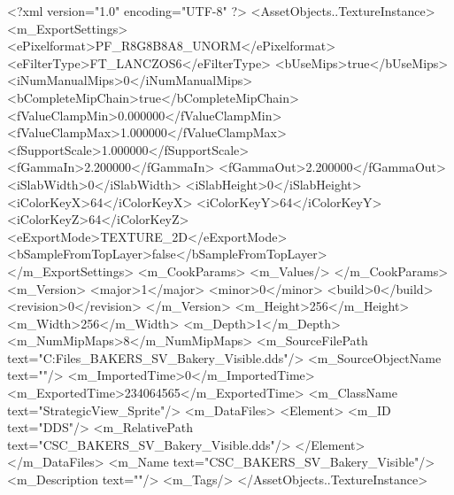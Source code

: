<?xml version="1.0" encoding="UTF-8" ?>
<AssetObjects..TextureInstance>
	<m_ExportSettings>
		<ePixelformat>PF_R8G8B8A8_UNORM</ePixelformat>
		<eFilterType>FT_LANCZOS6</eFilterType>
		<bUseMips>true</bUseMips>
		<iNumManualMips>0</iNumManualMips>
		<bCompleteMipChain>true</bCompleteMipChain>
		<fValueClampMin>0.000000</fValueClampMin>
		<fValueClampMax>1.000000</fValueClampMax>
		<fSupportScale>1.000000</fSupportScale>
		<fGammaIn>2.200000</fGammaIn>
		<fGammaOut>2.200000</fGammaOut>
		<iSlabWidth>0</iSlabWidth>
		<iSlabHeight>0</iSlabHeight>
		<iColorKeyX>64</iColorKeyX>
		<iColorKeyY>64</iColorKeyY>
		<iColorKeyZ>64</iColorKeyZ>
		<eExportMode>TEXTURE_2D</eExportMode>
		<bSampleFromTopLayer>false</bSampleFromTopLayer>
	</m_ExportSettings>
	<m_CookParams>
		<m_Values/>
	</m_CookParams>
	<m_Version>
		<major>1</major>
		<minor>0</minor>
		<build>0</build>
		<revision>0</revision>
	</m_Version>
	<m_Height>256</m_Height>
	<m_Width>256</m_Width>
	<m_Depth>1</m_Depth>
	<m_NumMipMaps>8</m_NumMipMaps>
	<m_SourceFilePath text="C:\Users\Shadow\Desktop\Working Files\Icons\StrategicView\CSC_BAKERS_SV_Bakery_Visible.dds"/>
	<m_SourceObjectName text=""/>
	<m_ImportedTime>0</m_ImportedTime>
	<m_ExportedTime>234064565</m_ExportedTime>
	<m_ClassName text="StrategicView_Sprite"/>
	<m_DataFiles>
		<Element>
			<m_ID text="DDS"/>
			<m_RelativePath text="CSC_BAKERS_SV_Bakery_Visible.dds"/>
		</Element>
	</m_DataFiles>
	<m_Name text="CSC_BAKERS_SV_Bakery_Visible"/>
	<m_Description text=""/>
	<m_Tags/>
</AssetObjects..TextureInstance>

